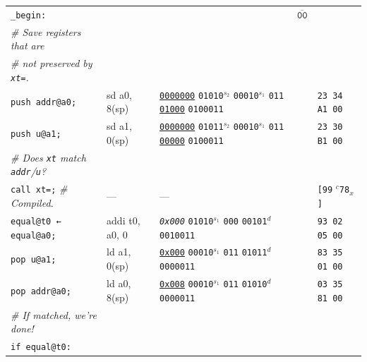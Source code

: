 \documentclass[a4paper,12pt,final]{article}
\begin{document}
\begin{table}[!htbp]
\begin{adjustwidth}{-1cm}{-1cm}
\begin{center}
\begin{tabular}{l|ll|l|l}
\texttt{\_begin:} &  &  & \(\overline{\texttt{00}}\) & \\[0pt]
\hspace{1.053000em} \emph{\# Save registers that are} &  &  &  & \\[0pt]
\hspace{1.053000em} \emph{\# not preserved by \texttt{xt=}.} &  &  &  & \\[0pt]
\hspace{1.053000em} \texttt{push addr@a0;} & sd a0, 8(sp) & \uline{\texttt{0000000}} \texttt{01010}​\(^{s_{2}}\) \texttt{00010}​\(^{s_{1}}\) \texttt{011} \uline{\texttt{01000}} \texttt{0100011} &  & \texttt{23 34 A1 00}\\[0pt]
\hspace{1.053000em} \texttt{push u@a1;} & sd a1, 0(sp) & \uline{\texttt{0000000}} \texttt{01011}​\(^{s_{2}}\) \texttt{00010}​\(^{s_{1}}\) \texttt{011} \uline{\texttt{00000}} \texttt{0100011} &  & \texttt{23 30 B1 00}\\[0pt]
\hspace{1.053000em} \emph{\# Does \texttt{xt} match \texttt{addr}​/​\texttt{u}?} &  &  &  & \\[0pt]
\hspace{1.053000em} \texttt{call xt=;}  \emph{\# Compiled.} & --- & --- &  & \texttt{[99} \(^{c}\)​\texttt{78}​\(_{x}\)​\texttt{]}\\[0pt]
\hspace{1.053000em} \texttt{equal@t0 ← equal@a0;} & addi t0, a0, 0 & \emph{\texttt{0x000}}                    \texttt{01010}​\(^{s_{1}}\) \texttt{000} \texttt{00101}​\(^{d}\)  \texttt{0010011} &  & \texttt{93 02 05 00}\\[0pt]
\hspace{1.053000em} \texttt{pop u@a1;} & ld a1, 0(sp) & \uline{\texttt{0x000}}                    \texttt{00010}​\(^{s_{1}}\) \texttt{011} \texttt{01011}​\(^{d}\)  \texttt{0000011} &  & \texttt{83 35 01 00}\\[0pt]
\hspace{1.053000em} \texttt{pop addr@a0;} & ld a0, 8(sp) & \uline{\texttt{0x008}}                    \texttt{00010}​\(^{s_{1}}\) \texttt{011} \texttt{01010}​\(^{d}\)  \texttt{0000011} &  & \texttt{03 35 81 00}\\[0pt]
\hspace{1.053000em} \emph{\# If matched, we're done!} &  &  &  & \\[0pt]
\hspace{1.053000em} \texttt{if equal@t0:} &  &  &  & \\[0pt]

\end{tabular}
\end{center}
\end{adjustwidth}
\end{table}
\end{document}
